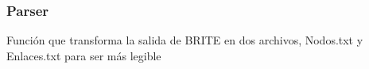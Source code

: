 


\subsubsection{Parser}

Función que transforma la salida de BRITE en dos archivos, Nodos.txt y Enlaces.txt para ser más legible

